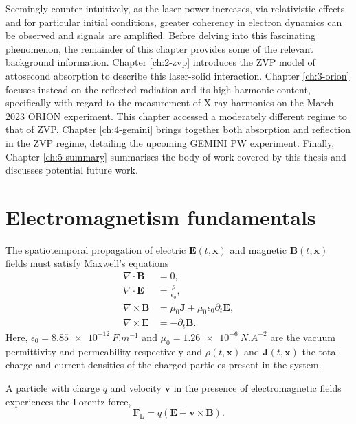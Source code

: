 Seemingly counter-intuitively, as the laser power increases, via relativistic effects and for particular initial conditions, greater coherency in electron dynamics can be observed and signals are amplified. Before delving into this fascinating phenomenon, the remainder of this chapter provides some of the relevant background information. Chapter \ref{ch:2-zvp} introduces the \ac{ZVP} model of attosecond absorption to describe this laser-solid interaction. Chapter \ref{ch:3-orion} focuses instead on the reflected radiation and its high harmonic content, specifically with regard to the measurement of X-ray harmonics on the March 2023 ORION experiment. This chapter accessed a moderately different regime to that of \ac{ZVP}. Chapter \ref{ch:4-gemini} brings together both absorption and reflection in the ZVP regime, detailing the upcoming GEMINI PW experiment. Finally, Chapter \ref{ch:5-summary} summarises the body of work covered by this thesis and discusses potential future work.


\section{Electromagnetism fundamentals}
The spatiotemporal propagation of electric $\mathbf{E}(t,\mathbf{x})$ and magnetic $\mathbf{B}(t,\mathbf{x})$ fields must satisfy Maxwell's equations \cite{chenIntroductionPlasmaPhysics2016}
\begin{subequations}
	\label{eq:intro-maxwell}
	\begin{align}
		\nabla \cdot \mathbf{B} &= 0, \label{eq:intro-B0} \\
		\nabla \cdot \mathbf{E} &= \frac{\rho}{\epsilon_0},\label{eq:intro-E0} \\
		\nabla \times \mathbf{B} &= \mu_0 \mathbf{J} + \mu_0 \epsilon_0 \partial_t \mathbf{E},\label{eq:intro-B1} \\
		\nabla \times \mathbf{E} &=-\partial_t \mathbf{B}. \label{eq:intro-E1}
	\end{align}
\end{subequations}
Here, $\epsilon_0 = \qty{8.85e-12}{F.m^{-1}}$ and $\mu_0 = \qty{1.26e-6}{N.A^{-2}}$ are the vacuum permittivity and permeability respectively and $\rho(t,\mathbf{x})$ and $\mathbf{J}(t,\mathbf{x})$ the total charge and current densities of the charged particles present in the system. 

A particle with charge $q$ and velocity $\mathbf{v}$ in the presence of electromagnetic fields experiences the Lorentz force,
\begin{equation}\label{eq:intro-Lorentz_force}
	\mathbf{F}_\mathrm{L} = q(\mathbf{E} + \mathbf{v} \times \mathbf{B}).
\end{equation}

